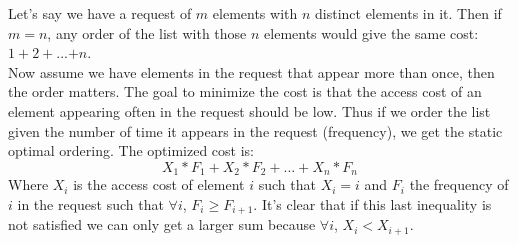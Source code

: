 Let's say we have a request of $m$ elements with $n$ distinct elements in it. Then if $m=n$, any order of the list with those $n$ elements would give the same cost: $1+2+$...$+n$.\\
Now assume we have elements in the request that appear more than once, then the order matters. The goal to minimize the cost is that the access cost of an element appearing often in the request should be low. Thus if we order the list given the number of time it appears in the request (frequency), we get the static optimal ordering. The optimized cost is:
$$
X_1*F_1+X_2*F_2+...+X_n*F_n
$$
Where $X_i$ is the access cost of element $i$ such that $X_i = i$ and $F_i$ the frequency of $i$ in the request such that $\forall i$, $F_i \geq F_{i+1}$. It's clear that if this last inequality is not satisfied we can only get a larger sum because $\forall i$, $X_i < X_{i+1}$.